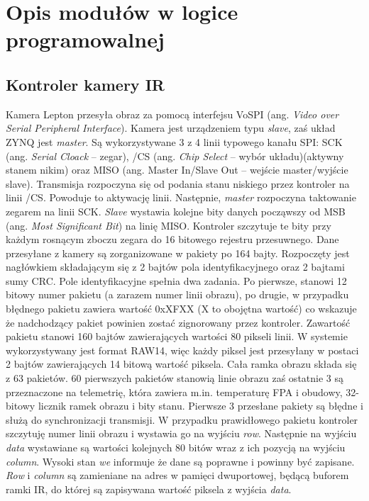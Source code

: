 \section{Opis modułów w logice programowalnej}
\subsection{Kontroler kamery IR}
Kamera Lepton przesyła obraz za pomocą interfejsu VoSPI (ang. \textit{Video over Serial Peripheral Interface}). Kamera jest urządzeniem typu \textit{slave}, zaś układ ZYNQ jest \textit{master}. Są wykorzystywane 3 z 4 linii typowego kanału SPI: SCK (ang. \textit{Serial Cloack} – zegar), /CS (ang. \textit{Chip Select} -- wybór układu)(aktywny stanem nikim) oraz MISO (ang. {Master In/Slave Out} – wejście master/wyjście slave).
Transmisja rozpoczyna się od podania stanu niskiego przez kontroler na linii /CS. Powoduje to aktywację linii. Następnie, \textit{master} rozpoczyna taktowanie zegarem na linii SCK. \textit{Slave} wystawia kolejne bity danych począwszy od MSB (ang. \textit{Most Significant Bit}) na linię MISO. Kontroler szczytuje te bity przy każdym rosnącym zboczu zegara do 16 bitowego rejestru przesuwnego.
Dane przesyłane z kamery są zorganizowane w pakiety po 164 bajty. Rozpoczęty jest nagłówkiem składającym się z 2 bajtów pola identyfikacyjnego oraz 2 bajtami sumy CRC. Pole identyfikacyjne spełnia dwa zadania. Po pierwsze, stanowi 12 bitowy numer pakietu (a zarazem numer linii obrazu), po drugie, w przypadku błędnego pakietu zawiera wartość 0xXFXX (X to obojętna wartość) co wskazuje że nadchodzący pakiet powinien zostać zignorowany przez kontroler. Zawartość pakietu stanowi 160 bajtów zawierających wartości 80 pikseli linii. W systemie wykorzystywany jest format RAW14, więc każdy piksel jest przesyłany w postaci 2 bajtów zawierających 14 bitową wartość piksela. 
Cała ramka obrazu składa się z 63 pakietów. 60 pierwszych pakietów stanowią linie obrazu zaś ostatnie 3 są przeznaczone na telemetrię, która zawiera m.in. temperaturę FPA i obudowy, 32-bitowy licznik ramek obrazu i bity stanu. 
Pierwsze 3 przesłane pakiety są błędne i służą do synchronizacji transmisji. 
W przypadku prawidłowego pakietu kontroler szczytuję numer linii obrazu i wystawia go na wyjściu \textit{row}. Następnie na wyjściu \textit{data} wystawiane są wartości kolejnych 80 bitów wraz z ich pozycją na wyjściu \textit{column}. Wysoki stan \textit{we} informuje że dane są poprawne i powinny być zapisane. 
\textit{Row} i \textit{column} są zamieniane na adres w pamięci dwuportowej, będącą buforem ramki IR, do której są zapisywana wartość piksela z wyjścia \textit{data}.


